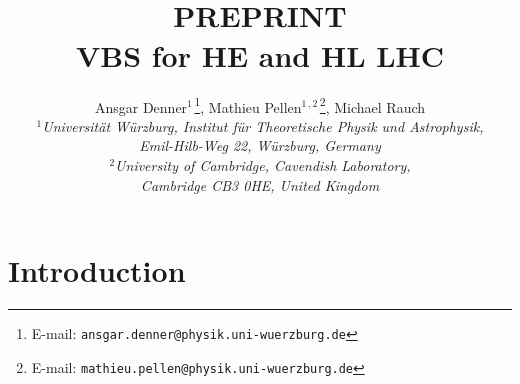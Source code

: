 \documentclass[11pt,epsf]{article}
\begin{document}
\title{\hfill ~\\[-30mm]
\phantom{h} \hfill\mbox{\small PREPRINT}
\\[1cm]
\vspace{13mm}   \textbf{VBS for HE and HL LHC}}

\date{}
\author{
Ansgar Denner$^{1\,}$\footnote{E-mail:
  \texttt{ansgar.denner@physik.uni-wuerzburg.de}},
Mathieu Pellen$^{1\,, 2\,}$\footnote{E-mail:
  \texttt{mathieu.pellen@physik.uni-wuerzburg.de}},
Michael Rauch
\\[9mm]
{\small\it
$^1$Universit\"at W\"urzburg, %
        Institut f\"ur Theoretische Physik und Astrophysik,} \\ %
{\small\it Emil-Hilb-Weg 22,  W\"urzburg, %
        Germany}\\[3mm]
{\small\it
$^2$University of Cambridge, Cavendish Laboratory,} \\ %
{\small\it Cambridge CB3 0HE, United Kingdom}\\[3mm]
}

\maketitle

\begin{abstract}
\noindent

\end{abstract}
\thispagestyle{empty}
\vfill
\newpage
\setcounter{page}{1}

\tableofcontents
\newpage


\section{Introduction}
\end{document}
